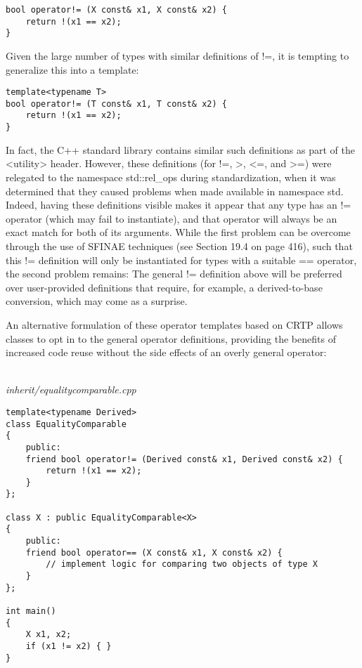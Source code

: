 \begin{lstlisting}[style=styleCXX]
bool operator!= (X const& x1, X const& x2) {
	return !(x1 == x2);
}
\end{lstlisting}

Given the large number of types with similar definitions of !=, it is tempting to generalize this into a template:

\begin{lstlisting}[style=styleCXX]
template<typename T>
bool operator!= (T const& x1, T const& x2) {
	return !(x1 == x2);
}
\end{lstlisting}

In fact, the C++ standard library contains similar such definitions as part of the <utility> header. However, these definitions (for !=, >, <=, and >=) were relegated to the namespace std::rel\_ops during standardization, when it was determined that they caused problems when made available in namespace std. Indeed, having these definitions visible makes it appear that any type has an != operator (which may fail to instantiate), and that operator will always be an exact match for both of its arguments. While the first problem can be overcome through the use of SFINAE techniques (see Section 19.4 on page 416), such that this != definition will only be instantiated for types with a suitable == operator, the second problem remains: The general !=  definition above will be preferred over user-provided definitions that require, for example, a derived-to-base conversion, which may come as a surprise.

An alternative formulation of these operator templates based on CRTP allows classes to opt in to the general operator definitions, providing the benefits of increased code reuse without the side effects of an overly general operator:

\hspace*{\fill} \\ %
\noindent
\textit{inherit/equalitycomparable.cpp}
\begin{lstlisting}[style=styleCXX]
template<typename Derived>
class EqualityComparable
{
	public:
	friend bool operator!= (Derived const& x1, Derived const& x2) {
		return !(x1 == x2);
	}
};

class X : public EqualityComparable<X>
{
	public:
	friend bool operator== (X const& x1, X const& x2) {
		// implement logic for comparing two objects of type X
	}
};

int main()
{
	X x1, x2;
	if (x1 != x2) { }
}
\end{lstlisting}


